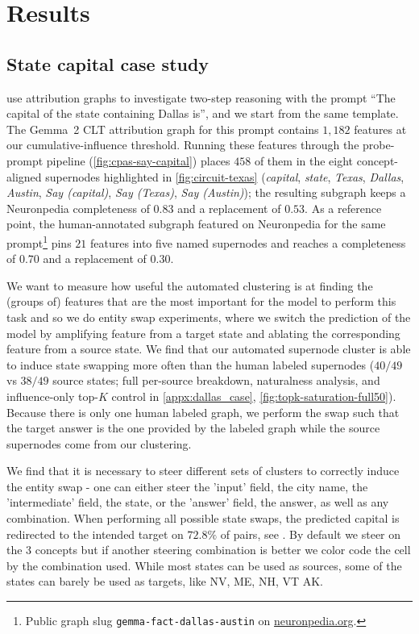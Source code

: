 \section{Results}
\label{sec:results}
\subsection{State capital case study}
\label{sec:results:primary}

\citet{lindsey2025biology} use attribution graphs to investigate two-step reasoning with the prompt ``The capital of the state containing Dallas is'', and we start from the same template. The Gemma~2 CLT attribution graph for this prompt contains $1{,}182$ features at our cumulative-influence threshold. Running these features through the probe-prompt pipeline (\cref{fig:cpas-say-capital}) places $458$ of them in the eight concept-aligned supernodes highlighted in \cref{fig:circuit-texas} (\emph{capital}, \emph{state}, \emph{Texas}, \emph{Dallas}, \emph{Austin}, \emph{Say (capital)}, \emph{Say (Texas)}, \emph{Say (Austin)}); the resulting subgraph keeps a Neuronpedia completeness of $0.83$ and a replacement of $0.53$. As a reference point, the human-annotated subgraph featured on Neuronpedia for the same prompt\footnote{Public graph slug \texttt{gemma-fact-dallas-austin} on \url{neuronpedia.org}.} pins $21$ features into five named supernodes and reaches a completeness of $0.70$ and a replacement of $0.30$.

We want to measure how useful the automated clustering is at finding the (groups of) features that are the most important for the model to perform this task and so we do entity swap experiments, where we switch the prediction of the model by amplifying feature from a target state and ablating the corresponding feature from a source state. We find that our automated supernode cluster is able to induce state swapping more often than the human labeled supernodes ($40/49$ vs $38/49$ source states; full per-source breakdown, naturalness analysis, and influence-only top-$K$ control in \cref{appx:dallas_case}, \cref{fig:topk-saturation-full50}). Because there is only one human labeled graph, we perform the swap such that the target answer is the one provided by the labeled graph while the source supernodes come from our clustering. 

We find that it is necessary to steer different sets of clusters to correctly induce the entity swap - one can either steer the 'input' field, the city name, the 'intermediate' field, the state, or the 'answer' field, the answer, as well as any combination. When performing all possible state swaps, the predicted capital is redirected to the intended target on $72.8\%$ of pairs, see . By default we steer on the 3 concepts but if another steering combination is better we color code the cell by the combination used. While most states can be used as sources, some of the states can barely be used as targets, like NV, ME, NH, VT AK.


